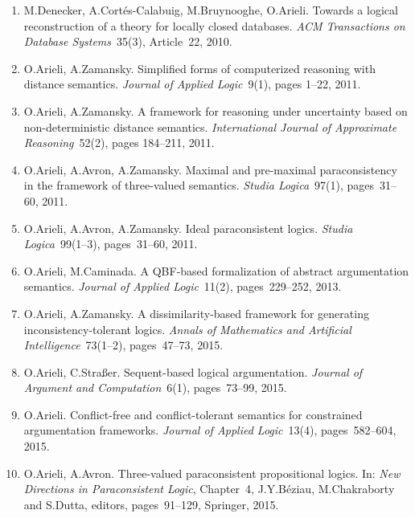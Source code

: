 \documentclass{article}
\begin{document}
\begin{enumerate}
    \item M.Denecker, A.Cort\'es-Calabuig, M.Bruynooghe, O.Arieli.
          Towards a logical reconstruction of a theory for locally closed databases.
          {\em ACM Transactions on Database Systems\/}~35(3), Article~22, 2010.

    \item O.Arieli, A.Zamansky.
          Simplified forms of computerized reasoning with distance semantics.
          {\em Journal of Applied Logic\/}~9(1), pages 1--22, 2011.

    \item O.Arieli, A.Zamansky.
          A framework for reasoning under uncertainty based on non-deterministic
          distance semantics.
          {\em International Journal of Approximate Reasoning\/}~52(2), pages 184--211, 2011.

    \item O.Arieli, A.Avron, A.Zamansky.
          Maximal and pre-maximal paraconsistency in the framework of three-valued semantics.
          {\em Studia Logica\/}~97(1), pages~31--60, 2011.

    \item O.Arieli, A.Avron, A.Zamansky.
          Ideal paraconsistent logics.
          {\em Studia Logica\/}~99(1--3), pages~31--60, 2011.

    \item O.Arieli, M.Caminada.
          A QBF-based formalization of abstract argumentation semantics.
          {\em Journal of Applied Logic\/}~11(2), pages~229--252, 2013.

    \item O.Arieli, A.Zamansky.
          A dissimilarity-based framework for generating inconsistency-tolerant logics.
          {\em Annals of Mathematics and Artificial Intelligence\/}~73(1--2),
          pages~47--73, 2015.

    \item O.Arieli, C.Stra{\ss}er.
          Sequent-based logical argumentation.
          {\em Journal of Argument and Computation\/}~6(1), pages~73--99, 2015.

    \item O.Arieli.
          Conflict-free and conflict-tolerant semantics for constrained argumentation frameworks.
          {\em Journal of Applied Logic\/}~13(4), pages~582--604, 2015.

    \item O.Arieli, A.Avron.
          Three-valued paraconsistent propositional logics.
          In: {\em New Directions in Paraconsistent Logic\/}, Chapter~4,
          J.Y.B\'eziau, M.Chakraborty and S.Dutta, editors,
          pages~91--129, Springer, 2015.


\end{enumerate}
\end{document}
